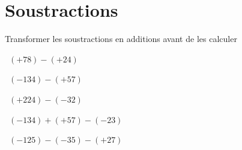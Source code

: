 \section{Soustractions}

Transformer les soustractions en additions avant de les calculer
\begin{questions}
	\question[2]  $(+78) - (+24)$
	\fillwithdottedlines{2cm}
	\begin{solution}
		
	\end{solution}	
	
	
	\question[2]  $(-134) - (+57)$
	\fillwithdottedlines{2cm}
	\begin{solution}
		
	\end{solution}	

	\question[2]  $(+224) - (-32)$
	\fillwithdottedlines{2cm}
	\begin{solution}
		
	\end{solution}	


	\question[2]  $(-134) + (+57) - (-23) $
	\fillwithdottedlines{2cm}
	\begin{solution}
		
	\end{solution}

	\question[2]  $(-125) - (-35) - (+27) $
	\fillwithdottedlines{2cm}
	\begin{solution}
		
	\end{solution}
\end{questions}